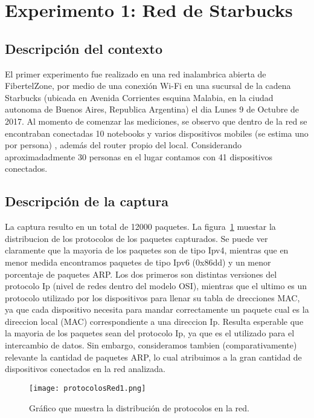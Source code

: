 \section{Experimento 1: Red de Starbucks}

\subsection{Descripción del contexto}

El primer experimento fue realizado en una red inalambrica abierta de FibertelZone, por medio de una conexión Wi-Fi en una sucursal de la cadena Starbucks (ubicada en Avenida Corrientes esquina Malabia, en la ciudad autonoma de Buenos Aires, Republica Argentina) el dia Lunes 9 de Octubre de 2017. 
Al momento de comenzar las mediciones, se observo que dentro de la red se encontraban conectadas 10 notebooks y varios dispositivos mobiles (se estima uno por persona) , además del router propio del local. Considerando aproximadadmente 30 personas en el lugar contamos con 41 dispositivos conectados. 

\subsection{Descripción de la captura}

La captura resulto en un total de 12000 paquetes. La figura~\ref{protocolos1} muestar la distribucion de los protocolos de los paquetes capturados. Se puede ver claramente que la mayoria de los paquetes son de tipo Ipv4, mientras que en menor medida encontramos paquetes de tipo Ipv6 (0x86dd) y un menor porcentaje de paquetes ARP. 
Los dos primeros son distintas versiones del protocolo Ip (nivel de redes dentro del modelo OSI), mientras que el ultimo es un protocolo utilizado por los dispositivos para llenar su tabla de drecciones MAC, ya que cada dispositivo necesita para mandar correctamente un paquete cual es la direccion local (MAC) correspondiente a una direccion Ip. 
Resulta esperable que la mayoria de los paquetes sean del protocolo Ip, ya que es el utilizado para el intercambio de datos. Sin embargo, consideramos tambien (comparativamente) relevante la cantidad de paquetes ARP, lo cual atribuimos a la gran cantidad de dispositivos conectados en la red analizada.

\begin{figure}[H]
\centering
\texttt{[image: protocolosRed1.png]}
\caption{Gráfico que muestra la distribución de protocolos en la red.}
\label{protocolos1}
\end{figure}

